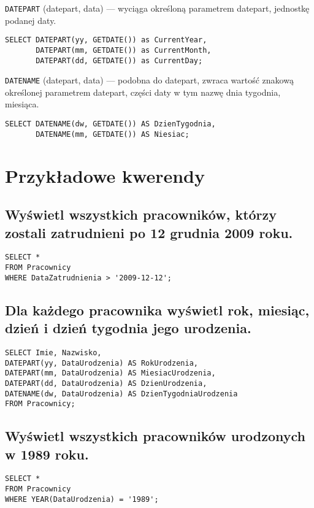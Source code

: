 \documentclass[a4paper]{article}
\begin{document}
{\tt DATEPART} (datepart, data) --- wyciąga określoną parametrem datepart, jednostkę podanej daty.
\begin{verbatim}
SELECT DATEPART(yy, GETDATE()) as CurrentYear,
       DATEPART(mm, GETDATE()) as CurrentMonth,
       DATEPART(dd, GETDATE()) as CurrentDay;
\end{verbatim}
{\tt DATENAME} (datepart, data) --- podobna do datepart, zwraca wartość znakową określonej parametrem datepart, części daty w tym nazwę dnia tygodnia, miesiąca.

\begin{verbatim}
SELECT DATENAME(dw, GETDATE()) AS DzienTygodnia,
       DATENAME(mm, GETDATE()) AS Niesiac;
\end{verbatim}

\section{Przykładowe kwerendy}

\subsection{Wyświetl wszystkich pracowników, którzy zostali zatrudnieni po 12 grudnia 2009 roku.}

\begin{verbatim}
SELECT *
FROM Pracownicy
WHERE DataZatrudnienia > '2009-12-12';
\end{verbatim}

\subsection{Dla każdego pracownika wyświetl rok, miesiąc, dzień i dzień tygodnia jego urodzenia.}

\begin{verbatim}
SELECT Imie, Nazwisko,
DATEPART(yy, DataUrodzenia) AS RokUrodzenia,
DATEPART(mm, DataUrodzenia) AS MiesiacUrodzenia,
DATEPART(dd, DataUrodzenia) AS DzienUrodzenia,
DATENAME(dw, DataUrodzenia) AS DzienTygodniaUrodzenia
FROM Pracownicy;
\end{verbatim}

\subsection{Wyświetl wszystkich pracowników urodzonych w 1989 roku.}
\begin{verbatim}
SELECT *
FROM Pracownicy
WHERE YEAR(DataUrodzenia) = '1989';
\end{verbatim}
\end{document}
